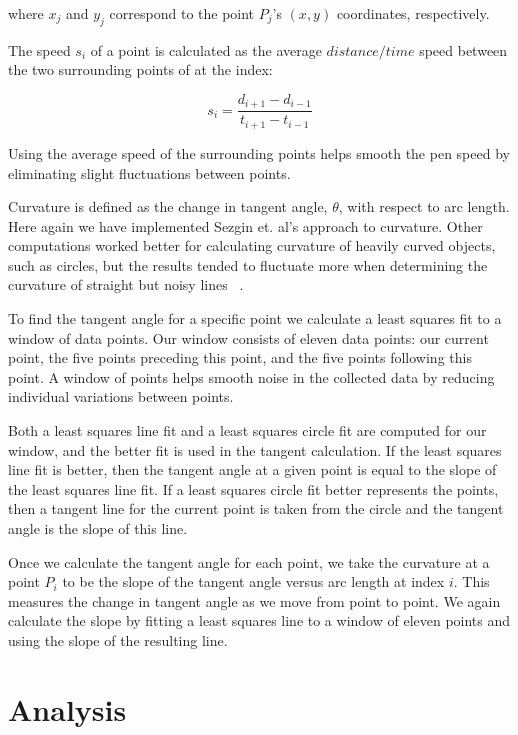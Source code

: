\documentclass[10pt]{acmsiggraph}          %
\begin{document}
\noindent where $x_j$ and $y_j$ correspond to the point $P_j$'s $(x,y)$ coordinates, respectively.

The speed $s_i$ of a point is calculated as the average $distance/time$ speed between the two surrounding points of at the index:

\begin{equation}
s_i = \frac{d_{i+1} - d_{i-1}}{t_{i+1} - t_{i-1}}
\end{equation}

\noindent Using the average speed of the surrounding points helps smooth the pen speed by eliminating slight fluctuations between points.

Curvature is defined as the change in tangent angle, $\theta$, with respect to arc length. Here again we have implemented Sezgin et. al's approach
to curvature. Other computations worked better for calculating curvature of heavily curved objects, such as
circles, but the results tended to fluctuate more when determining the curvature of straight but noisy lines ~\cite{Yu03}.

To find the tangent angle for a specific point we calculate a least squares fit to a window of data points. Our window consists of
eleven data points: our current point, the five points preceding this point, and the five points following this point. A window of
points helps smooth noise in the collected data by reducing individual variations between points. 

Both a least squares line fit and a least squares circle fit are computed for our window, and the better fit is used in the tangent 
calculation. If the least squares line fit is better, then the tangent angle at a given point is equal to the slope of the least squares line fit.
If a least squares circle fit better represents the points, then a tangent line for the current point is taken from the circle and the
tangent angle is the slope of this line.

Once we calculate the tangent angle for each point, we take the curvature at a point $P_i$ to be the slope of the tangent angle versus arc length at index $i$. 
This measures the change in tangent angle as we move from point to point. We again calculate the slope by fitting a least squares line to a window of eleven points
and using the slope of the resulting line.


\section{Analysis}
\end{document}
